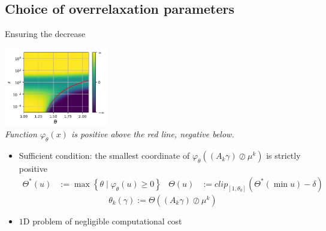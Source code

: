 \documentclass[compress]{beamer}
\begin{document}
\subsection[Choice of OR parameters]{Choice of overrelaxation parameters}
\begin{frame}{Ensuring the decrease}
\begin{center}
	\vspace*{-0.2cm}\includegraphics[width=4.5cm]{images/cvgce_zone_2.png}\vspace{-0.2cm}\\
	{\small \em Function $\varphi_\theta(x)$ is positive above the red line, negative below.}
\end{center}
\pause
\begin{itemize}
\item Sufficient condition: the smallest  coordinate of $\varphi_\theta \left((A_k \gamma) \oslash \mu^k \right)$ is strictly positive
\pause
\begin{align*}
\Theta^*(u) &:= \max \left\{\theta \mid \varphi_\theta(u) \ge 0 \right\}
&
\Theta(u) &:= clip_{[1,\theta_0]}(\Theta^*(\min u)-\delta)
\end{align*}
\[
\theta_k (\gamma) := \Theta((A_k \gamma) \oslash \mu^k)
\]
\pause
\item $1$D problem of negligible computational cost
\end{itemize}
\end{frame}
\end{document}
